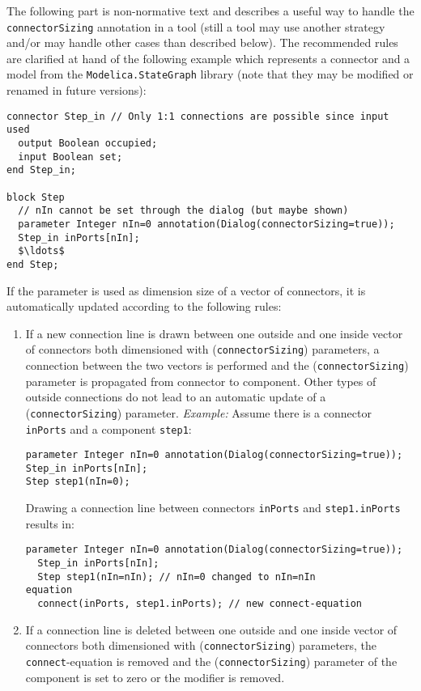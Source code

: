 \begin{nonnormative}
The following part is non-normative text and describes a useful way to handle the \lstinline!connectorSizing! annotation in a tool (still a tool may use another strategy and/or may handle other cases than described below).
The recommended rules are clarified at hand of the following example which represents a connector and a model from the \lstinline!Modelica.StateGraph! library (note that they may be modified or renamed in future versions):
\begin{lstlisting}[language=modelica]
connector Step_in // Only 1:1 connections are possible since input used
  output Boolean occupied;
  input Boolean set;
end Step_in;

block Step
  // nIn cannot be set through the dialog (but maybe shown)
  parameter Integer nIn=0 annotation(Dialog(connectorSizing=true));
  Step_in inPorts[nIn];
  $\ldots$
end Step;
\end{lstlisting}
If the parameter is used as dimension size of a vector of connectors, it is automatically updated according to the following rules:
\begin{enumerate}
\item \label{connectorSizing:addVector}
  If a new connection line is drawn between one outside and one inside vector of connectors both dimensioned with (\lstinline!connectorSizing!) parameters, a connection between the two vectors is performed and the (\lstinline!connectorSizing!) parameter is propagated from connector to component.
  Other types of outside connections do not lead to an automatic update of a (\lstinline!connectorSizing!) parameter.
  \emph{Example:} Assume there is a connector \lstinline!inPorts! and a component \lstinline!step1!:
\begin{lstlisting}[language=modelica]
parameter Integer nIn=0 annotation(Dialog(connectorSizing=true));
Step_in inPorts[nIn];
Step step1(nIn=0);
\end{lstlisting}
  Drawing a connection line between connectors \lstinline!inPorts! and \lstinline!step1.inPorts! results in:
\begin{lstlisting}[language=modelica]
  parameter Integer nIn=0 annotation(Dialog(connectorSizing=true));
  Step_in inPorts[nIn];
  Step step1(nIn=nIn); // nIn=0 changed to nIn=nIn
equation
  connect(inPorts, step1.inPorts); // new connect-equation
\end{lstlisting}
\item\label{connectorSizing:deleteVector}
  If a connection line is deleted between one outside and one inside vector of connectors both dimensioned with (\lstinline!connectorSizing!) parameters, the \lstinline!connect!-equation is removed and the (\lstinline!connectorSizing!) parameter of the component is set to zero or the modifier is removed.

\end{enumerate}
\end{nonnormative}
